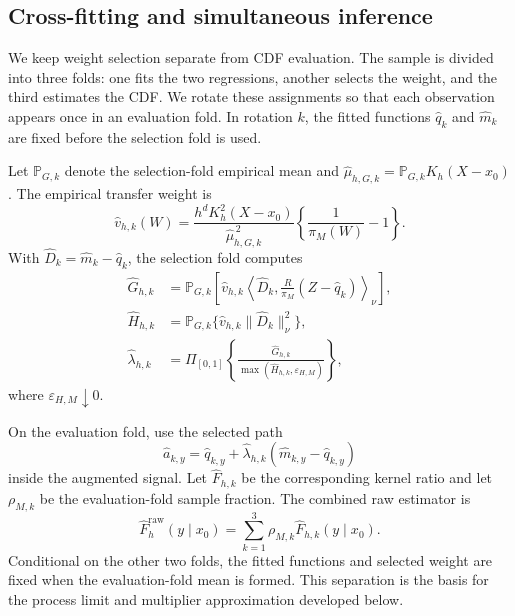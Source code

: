\subsection{Cross-fitting and simultaneous inference}

We keep weight selection separate from CDF evaluation. The sample is divided
into three folds: one fits the two regressions, another selects the weight, and
the third estimates the CDF. We rotate these assignments so that each
observation appears once in an evaluation fold. In rotation \(k\), the fitted
functions \(\widehat q_k\) and \(\widehat m_k\) are fixed before the selection
fold is used.

Let \(\mathbb P_{G,k}\) denote the selection-fold empirical mean and \(\widehat\mu_{h,G,k}=\mathbb P_{G,k}K_h(X-x_0)\). The empirical transfer weight is
\begin{equation}
\widehat v_{h,k}(W)
=
\frac{h^dK_h^2(X-x_0)}{\widehat\mu_{h,G,k}^{\,2}}
\left\{\frac1{\pi_M(W)}-1\right\}.
\label{eq:vhat}
\end{equation}
With \(\widehat D_k=\widehat m_k-\widehat q_k\), the selection fold computes
\[
\begin{aligned}
\widehat G_{h,k}
&=
\mathbb P_{G,k}
\left[
\widehat v_{h,k}
\left\langle
\widehat D_k,
\frac{R}{\pi_M}(Z-\widehat q_k)
\right\rangle_\nu
\right],\\
\widehat H_{h,k}
&=
\mathbb P_{G,k}
\{\widehat v_{h,k}\|\widehat D_k\|_\nu^2\},\\
\widehat\lambda_{h,k}
&=
\Pi_{[0,1]}
\left\{
\frac{\widehat G_{h,k}}
{\max(\widehat H_{h,k},\varepsilon_{H,M})}
\right\},
\end{aligned}
\]
where \(\varepsilon_{H,M}\downarrow0\).

On the evaluation fold, use the selected path
\[
\widehat a_{k,y}
=
\widehat q_{k,y}
+
\widehat\lambda_{h,k}
(\widehat m_{k,y}-\widehat q_{k,y})
\]
inside the augmented signal. Let \(\widehat F_{h,k}\) be the corresponding kernel ratio and let \(\rho_{M,k}\) be the evaluation-fold sample fraction. The combined raw estimator is
\begin{equation}
\widehat F_h^{\mathrm{raw}}(y\mid x_0)
=
\sum_{k=1}^3\rho_{M,k}\widehat F_{h,k}(y\mid x_0).
\label{eq:final-estimator}
\end{equation}
Conditional on the other two folds, the fitted functions and selected weight
are fixed when the evaluation-fold mean is formed. This separation is the basis
for the process limit and multiplier approximation developed below.

